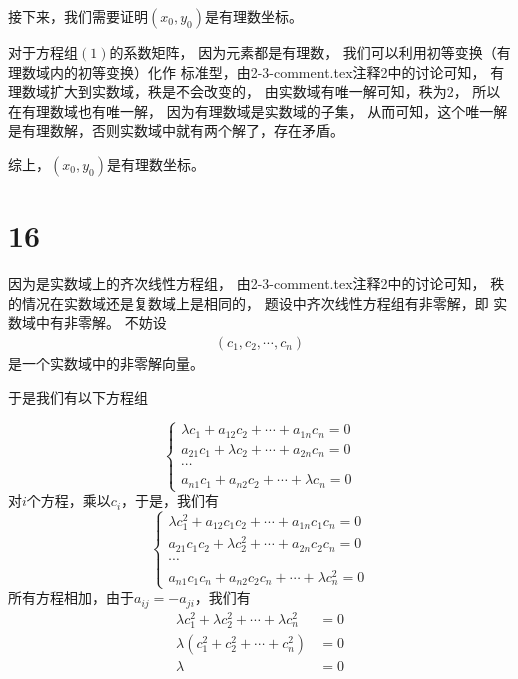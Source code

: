 \documentclass{article}
\begin{document}
\begin{itemize}
        接下来，我们需要证明$(x_0, y_0)$是有理数坐标。

        对于方程组$(1)$的系数矩阵，
        因为元素都是有理数，
        我们可以利用初等变换（有理数域内的初等变换）化作
        标准型，由2-3-comment.tex注释2中的讨论可知，
        有理数域扩大到实数域，秩是不会改变的，
        由实数域有唯一解可知，秩为$2$，
        所以在有理数域也有唯一解，
        因为有理数域是实数域的子集，
        从而可知，这个唯一解是有理数解，否则实数域中就有两个解了，存在矛盾。

        综上，$(x_0, y_0)$是有理数坐标。
\end{itemize}

\section*{16}

因为是实数域上的齐次线性方程组，
由2-3-comment.tex注释2中的讨论可知，
秩的情况在实数域还是复数域上是相同的，
题设中齐次线性方程组有非零解，即
实数域中有非零解。
不妨设
\begin{align*}
  (c_1, c_2, \cdots, c_n)
\end{align*}
是一个实数域中的非零解向量。

于是我们有以下方程组

\begin{equation*}
  \begin{cases*}
    \lambda c_1 + a_{12} c_2 + \cdots + a_{1n} c_n = 0 \\
    a_{21} c_1 + \lambda c_2 + \cdots + a_{2n} c_n = 0 \\
    \cdots                                             \\
    a_{n1}c_1 + a_{n2}c_2 + \cdots + \lambda c_n = 0
  \end{cases*}
\end{equation*}
对$i$个方程，乘以$c_i$，于是，我们有
\begin{equation*}
  \begin{cases*}
    \lambda c_1^2 + a_{12} c_1c_2 + \cdots + a_{1n} c_1c_n = 0 \\
    a_{21} c_1c_2 + \lambda c_2^2 + \cdots + a_{2n} c_2c_n = 0 \\
    \cdots                                                     \\
    a_{n1}c_1c_n + a_{n2}c_2c_n + \cdots + \lambda c_n^2 = 0
  \end{cases*}
\end{equation*}
所有方程相加，由于$a_{ij} = - a_{ji}$，我们有
\begin{align*}
  \lambda c_1^2 + \lambda c_2^2 + \cdots + \lambda c_n^2 & = 0 \\
  \lambda (c_1^2 + c_2^2 + \cdots + c_n^2)               & = 0 \\
  \lambda                                                & = 0
\end{align*}
\end{document}
